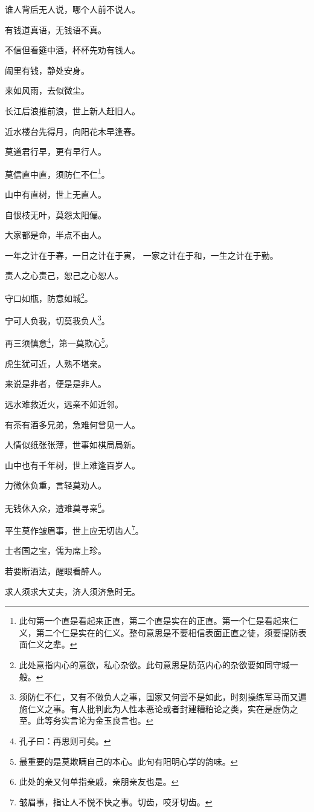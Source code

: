 \documentclass[12pt,oneside]{book}
\begin{document}
谁人背后无人说，哪个人前不说人。

有钱道真语，无钱语不真。

不信但看筵中酒，杯杯先劝有钱人。

闹里有钱，静处安身。

来如风雨，去似微尘。

长江后浪推前浪，世上新人赶旧人。

近水楼台先得月，向阳花木早逢春。

莫道君行早，更有早行人。

莫信直中直，须防仁不仁\footnote{此句第一个直是看起来正直，第二个直是实在的正直。第一个仁是看起来仁义，第二个仁是实在的仁义。整句意思是不要相信表面正直之徒，须要提防表面仁义之辈。}。

山中有直树，世上无直人。

自恨枝无叶，莫怨太阳偏。

大家都是命，半点不由人。

一年之计在于春，一日之计在于寅， 一家之计在于和，一生之计在于勤。

责人之心责己，恕己之心恕人。

守口如瓶，防意如城\footnote{此处意指内心的意欲，私心杂欲。此句意思是防范内心的杂欲要如同守城一般。}。

宁可人负我，切莫我负人\footnote{须防仁不仁，又有不做负人之事，国家又何尝不是如此，时刻操练军马而又遍施仁义之事。有人批判此为人性本恶论或者封建糟粕论之类，实在是虚伪之至。此等务实言论为金玉良言也。}。

再三须慎意\footnote{孔子曰：再思则可矣。}，第一莫欺心\footnote{最重要的是莫欺瞒自己的本心。此句有阳明心学的韵味。}。

虎生犹可近，人熟不堪亲。

来说是非者，便是是非人。

远水难救近火，远亲不如近邻。

有茶有酒多兄弟，急难何曾见一人。

人情似纸张张薄，世事如棋局局新。

山中也有千年树，世上难逢百岁人。

力微休负重，言轻莫劝人。

无钱休入众，遭难莫寻亲\footnote{此处的亲又何单指亲戚，亲朋亲友也是。}。

平生莫作皱眉事，世上应无切齿人\footnote{皱眉事，指让人不悦不快之事。切齿，咬牙切齿。}。

士者国之宝，儒为席上珍。

若要断酒法，醒眼看醉人。

求人须求大丈夫，济人须济急时无。
\end{document}

